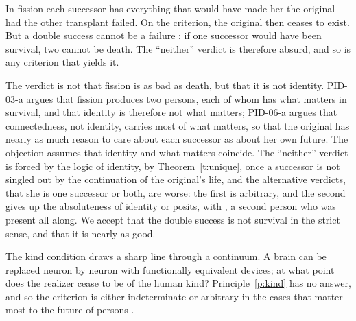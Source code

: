 \documentclass{situationist-preprint}
\begin{document}
\begin{objection}\label{o:double}
In fission each successor has everything that would have made her the original had the other transplant failed. On the criterion, the original then ceases to exist. But a double success cannot be a failure \citep[ch.~12]{Parfit1984}: if one successor would have been survival, two cannot be death. The \enquote{neither} verdict is therefore absurd, and so is any criterion that yields it.
\end{objection}

\begin{reply}
The verdict is not that fission is as bad as death, but that it is not identity. PID-03-a argues that fission produces two persons, each of whom has what matters in survival, and that identity is therefore not what matters; PID-06-a argues that connectedness, not identity, carries most of what matters, so that the original has nearly as much reason to care about each successor as about her own future. The objection assumes that identity and what matters coincide. The \enquote{neither} verdict is forced by the logic of identity, by Theorem~\ref{t:unique}, once a successor is not singled out by the continuation of the original's life, and the alternative verdicts, that she is one successor or both, are worse: the first is arbitrary, and the second gives up the absoluteness of identity or posits, with \citet{Lewis1976}, a second person who was present all along. We accept that the double success is not survival in the strict sense, and that it is nearly as good.
\end{reply}

\begin{objection}\label{o:kind}
The kind condition draws a sharp line through a continuum. A brain can be replaced neuron by neuron with functionally equivalent devices; at what point does the realizer cease to be of the human kind? Principle~\ref{p:kind} has no answer, and so the criterion is either indeterminate or arbitrary in the cases that matter most to the future of persons \citep{Chalmers2010}.
\end{objection}
\end{document}

